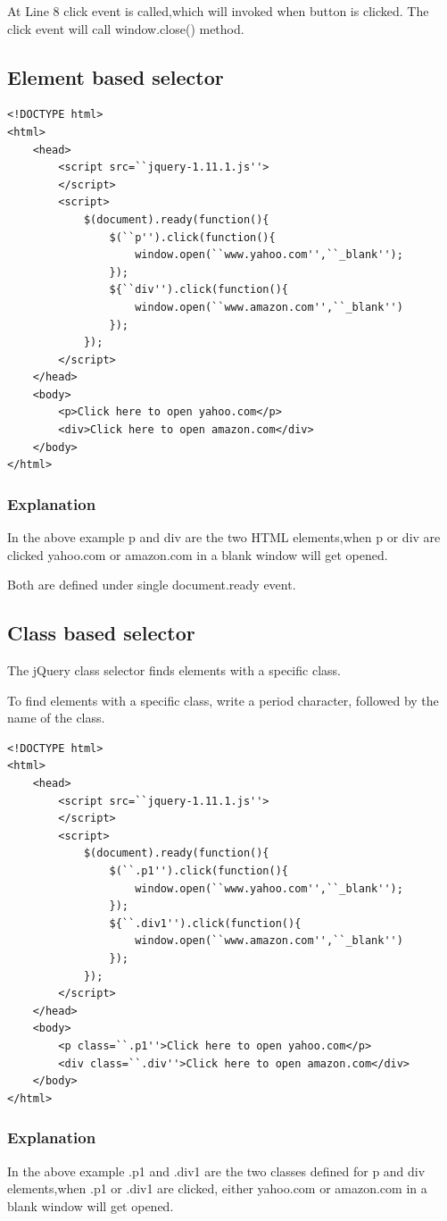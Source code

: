 \documentclass[11pt,a4paper]{article}
\begin{document}
At Line 8 click event is called,which will invoked when button is clicked. The click event will call window.close() method.
\subsection*{Element based selector}
\begin{lstlisting}
<!DOCTYPE html>
<html>
    <head>
        <script src=``jquery-1.11.1.js''>
        </script>
        <script>
            $(document).ready(function(){
                $(``p'').click(function(){
                    window.open(``www.yahoo.com'',``_blank'');
                });
                ${``div'').click(function(){
                    window.open(``www.amazon.com'',``_blank'')
                });
            });
        </script>
    </head>
    <body>
        <p>Click here to open yahoo.com</p>
        <div>Click here to open amazon.com</div>
    </body>
</html>
\end{lstlisting}
\subsubsection*{Explanation}
In the above example p and div are the two HTML elements,when p or div are clicked yahoo.com or amazon.com in a blank window will get opened.

Both are defined under single document.ready event.
\subsection*{Class based selector}
The jQuery class selector finds elements with a specific class.

To find elements with a specific class, write a period character, followed by the name of the class.
\begin{lstlisting}
<!DOCTYPE html>
<html>
    <head>
        <script src=``jquery-1.11.1.js''>
        </script>
        <script>
            $(document).ready(function(){
                $(``.p1'').click(function(){
                    window.open(``www.yahoo.com'',``_blank'');
                });
                ${``.div1'').click(function(){
                    window.open(``www.amazon.com'',``_blank'')
                });
            });
        </script>
    </head>
    <body>
        <p class=``.p1''>Click here to open yahoo.com</p>
        <div class=``.div''>Click here to open amazon.com</div>
    </body>
</html>
\end{lstlisting}
\subsubsection*{Explanation}
In the above example .p1 and .div1 are the two classes defined for p and div elements,when .p1 or .div1 are clicked, either yahoo.com or amazon.com in a blank window will get opened.
\end{document}
